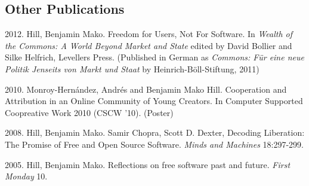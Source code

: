 \documentclass[10pt]{article}
\newenvironment{cvlist}{
\begin{list}{}{\leftmargin=3.0em \itemindent=-3.0em}
  \setlength{\itemsep}{0pt}
  \setlength{\parskip}{0em}
  \setlength{\parsep}{1em}
  \setlength{\parindent}{0em}}
{\vspace{1em}
\end{list}}
\begin{document}


\subsection{Other Publications}
\begin{cvlist}
\item 2012. Hill, Benjamin Mako. Freedom for Users, Not For Software.
  In \emph{Wealth of the Commons: A World Beyond Market and State}
  edited by David Bollier and Silke Helfrich, Levellers
  Press. (Published in German as \emph{Commons: Für eine neue Politik
    Jenseits von Markt und Staat} by Heinrich-Böll-Stiftung, 2011)
\item 2010. Monroy-Hernández, Andrés and Benjamin Mako
  Hill. Cooperation and Attribution in an Online Community of
  Young Creators. In Computer Supported Coopreative Work 2010
  (CSCW '10). (Poster)
\item 2008. Hill, Benjamin Mako. Samir Chopra, Scott
  D. Dexter, Decoding Liberation: The Promise of Free and Open Source
  Software. \emph{Minds and Machines} 18:297-299.
\item 2005. Hill, Benjamin Mako. Reflections on free
  software past and future. \emph{First Monday} 10.

\end{cvlist}
\end{document}
